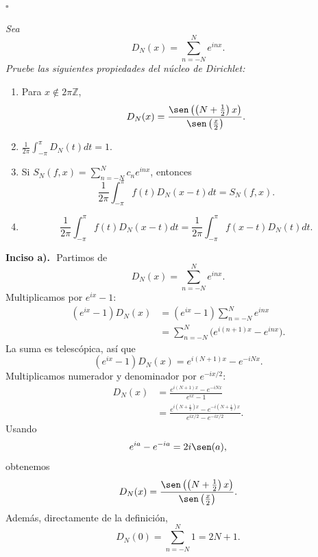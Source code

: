 \documentclass[11pt,letterpaper]{article}
\newcommand{\Z}{\mathbb{Z}}
\begin{document}
\hfill $\square$
\begin{tcolorbox}[title=\textcolor{white}{Problema 8}]
\textit{Sea}
\begin{equation*}
    D_N(x)=\sum_{n=-N}^{N}e^{inx}.
\end{equation*}
\textit{Pruebe las siguientes propiedades del núcleo de Dirichlet:}
\begin{enumerate}
    \item[\textbf{a)}] Para $x\notin 2\pi\Z$,
    \begin{equation*}
        D_N(x)=\frac{\sen\left(\left(N+\frac12\right)x\right)}{\sen\left(\frac{x}{2}\right)}.
    \end{equation*}
    \item[\textbf{b)}] $\displaystyle \frac{1}{2\pi}\int_{-\pi}^{\pi}D_N(t)dt=1$.
    \item[\textbf{c)}] Si $S_N(f,x)=\displaystyle\sum_{n=-N}^{N}c_ne^{inx}$, entonces
    \begin{equation*}
        \frac{1}{2\pi}\int_{-\pi}^{\pi}f(t)D_N(x-t)dt=S_N(f,x).
    \end{equation*}
    \item[\textbf{d)}]
    \begin{equation*}
        \frac{1}{2\pi}\int_{-\pi}^{\pi}f(t)D_N(x-t)dt
        =\frac{1}{2\pi}\int_{-\pi}^{\pi}f(x-t)D_N(t)dt.
    \end{equation*}
\end{enumerate}
\end{tcolorbox}

\textbf{Inciso a).}\,\
Partimos de
\begin{equation*}
    D_N(x)=\sum_{n=-N}^{N}e^{inx}.
\end{equation*}
Multiplicamos por $e^{ix}-1$:
\begin{align*}
    (e^{ix}-1)D_N(x)
    &=(e^{ix}-1)\sum_{n=-N}^{N}e^{inx} \\
    &=\sum_{n=-N}^{N}\bigl(e^{i(n+1)x}-e^{inx}\bigr).
\end{align*}
La suma es telescópica, así que
\begin{equation*}
    (e^{ix}-1)D_N(x)=e^{i(N+1)x}-e^{-iNx}.
\end{equation*}
Multiplicamos numerador y denominador por $e^{-ix/2}$:
\begin{align*}
    D_N(x)
    &=\frac{e^{i(N+1)x}-e^{-iNx}}{e^{ix}-1} \\
    &=\frac{e^{i\left(N+\frac12\right)x}-e^{-i\left(N+\frac12\right)x}}{e^{ix/2}-e^{-ix/2}}.
\end{align*}
Usando
\begin{equation*}
    e^{ia}-e^{-ia}=2i\sen(a),
\end{equation*}
obtenemos
\begin{equation*}
    D_N(x)=\frac{\sen\left(\left(N+\frac12\right)x\right)}{\sen\left(\frac{x}{2}\right)}.
\end{equation*}
Además, directamente de la definición,
\begin{equation*}
    D_N(0)=\sum_{n=-N}^{N}1=2N+1.
\end{equation*}
\end{document}
